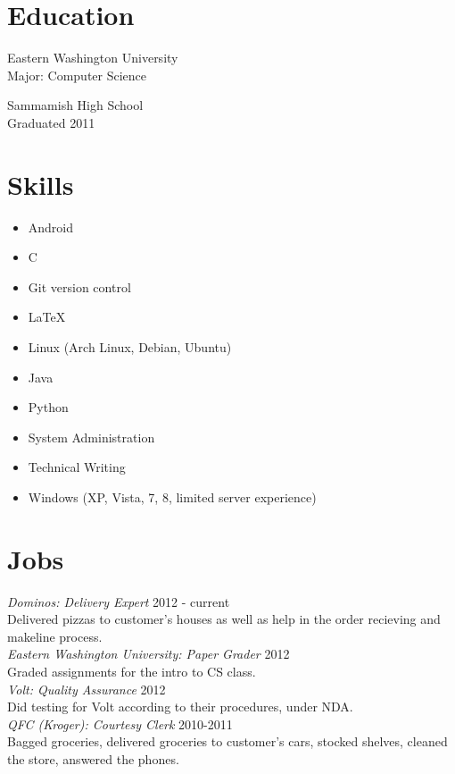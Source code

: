 \documentclass[line, margin, 10pt]{res}
\begin{document}
\address{12924 SE 26th ST \\ Bellevue WA, 98005 \\ +1 (425) 221-7761}
     
\begin{resume}
\section{Education}
Eastern Washington University \\
Major: Computer Science

Sammamish High School \\
Graduated 2011
     
\section{Skills}
\begin{itemize}
\item Android 
\item C
\item Git version control
\item \LaTeX
\item Linux (Arch Linux, Debian, Ubuntu)
\item Java
\item Python
\item System Administration
\item Technical Writing
\item Windows (XP, Vista, 7, 8, limited server experience)
\end{itemize}
     
\section{Jobs}
\textit{Dominos: Delivery Expert} \hfill 2012 - current \\
Delivered pizzas to customer's houses as well as help in the order
recieving and makeline process. \\ [10pt]
\textit{Eastern Washington University: Paper Grader} \hfill 2012 \\
Graded assignments for the intro to CS class. \\ [10pt]
\textit{Volt: Quality Assurance} \hfill 2012 \\
Did testing for Volt according to their procedures, under NDA. \\ [10pt]
\textit{QFC (Kroger): Courtesy Clerk} \hfill 2010-2011 \\
Bagged groceries, delivered groceries to customer's cars, stocked
shelves, cleaned the store, answered the phones. \\ [10pt]


\end{resume}
\end{document}
